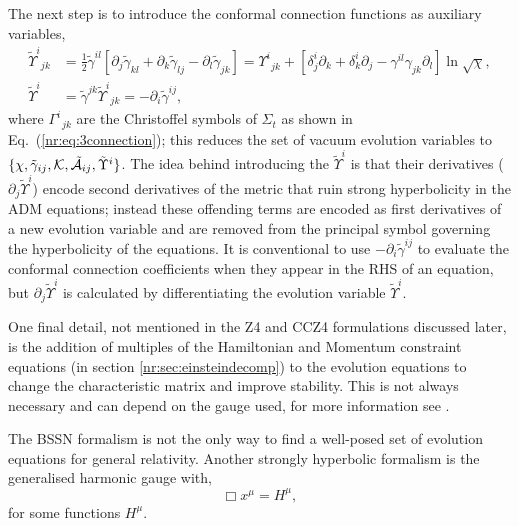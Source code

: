 The next step is to introduce the conformal connection functions as auxiliary variables,
\begin{align}
 \tilde{\Upsilon}^i_{\,\;jk} &= \frac{1}{2}\tilde{\gamma}^{il}\left[ \partial_j \tilde{\gamma}_{kl} + \partial_k \tilde{\gamma}_{lj} - \partial_l \tilde{\gamma}_{jk}\right] = \Upsilon^i_{\;\,jk} + \left[ \delta^i_j \partial_k + \delta^i_k \partial_j - \gamma^{il}\gamma_{jk}\partial_l\right] \ln \sqrt{\chi},\\
 \tilde{\Upsilon}^i &= \tilde{\gamma}^{jk}\tilde{\Upsilon}^i_{\,\;jk} = -\partial_i \tilde{\gamma}^{ij},
 \end{align}
where $\Gamma^i_{\,\,\,jk}$ are the Christoffel symbols of $\Sigma_t$ as shown
in Eq.~(\ref{nr:eq:3connection});
this reduces the set of vacuum evolution variables to $\{\chi,\tilde{\gamma}_{ij},
\mathcal{K},\tilde{\mathcal{A}}_{ij},\tilde{\Upsilon}^i \}$. The idea behind introducing the $\tilde{\Upsilon}^i$ is that
their derivatives ($\partial_j\tilde{\Upsilon}^i$) encode second derivatives of the metric
that ruin strong hyperbolicity in the ADM equations; instead these offending terms are
encoded as first derivatives of a new evolution variable and are removed from the principal symbol governing the
hyperbolicity of the equations. It is conventional to use $-\partial_i
\tilde{\gamma}^{ij}$ to evaluate the conformal connection coefficients when they
appear in the RHS of an equation, but $\partial_j \tilde{\Upsilon}^i$ is calculated
by differentiating the evolution variable $\tilde{\Upsilon}^i$.

One final detail, not mentioned in the Z4 and CCZ4 formulations discussed
later, is the addition of multiples of the Hamiltonian and Momentum
constraint equations (in section
\ref{nr:sec:einsteindecomp}) to the evolution equations to change the
characteristic matrix and improve stability. This is not always necessary and
can depend on the gauge used, for more information see \cite{Gundlach:2004jp}.

The BSSN formalism is not the only way to find a well-posed set of evolution
equations for general relativity. Another strongly hyperbolic formalism is the
generalised harmonic gauge \cite{Garfinkle:2001ni,garfinkle2002harmonic,Pretorius:2004jg,Pretorius:2005gq} with,
\begin{equation}\Box x^\mu = H^\mu,\end{equation}
for some functions $H^\mu$.


